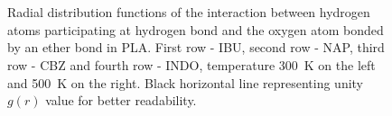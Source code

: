 \begin{figure}[H]
	\\
	\vspace{-0.2cm}
	\\
	\vspace{-0.4cm}
	\caption{Radial distribution functions of the interaction between hydrogen atoms participating at hydrogen bond and the oxygen atom bonded by an ether bond in PLA. First row - IBU, second row - NAP, third row - CBZ and fourth row - INDO, temperature 300~K on the left and 500~K on the right. Black horizontal line representing unity $g(r)$ value for better readability.}
	\label{fig:ether}
\end{figure}

